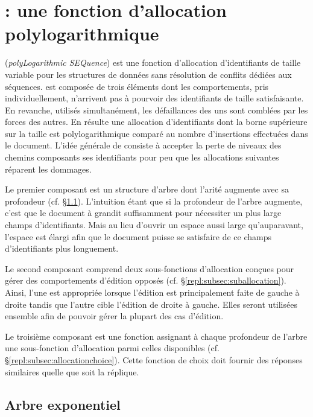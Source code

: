 
\section{\LSEQ : une fonction d'allocation polylogarithmique}
\label{repl:sec:proposal}

\LSEQ (\emph{polyLogarithmic SEQuence}) est une fonction d'allocation
d'identifiants de taille variable pour les structures de données sans résolution
de conflits dédiées aux séquences. \LSEQ est composée de trois éléments dont les
comportements, pris individuellement, n'arrivent pas à pourvoir des identifiants
de taille satisfaisante. En revanche, utilisés simultanément, les défaillances
des uns sont comblées par les forces des autres. En résulte une allocation
d'identifiants dont la borne supérieure sur la taille est polylogarithmique
comparé au nombre d'insertions effectuées dans le document. 
L'idée générale de \LSEQ consiste à accepter la perte de niveaux des chemins
composants ses identifiants pour peu que les allocations suivantes réparent les
dommages.

Le premier composant est un structure d'arbre dont l'arité augmente avec sa
profondeur (cf. §\ref{repl:subsec:exponentialtree}). L'intuition étant que si la
profondeur de l'arbre augmente, c'est que le document à grandit suffisamment
pour nécessiter un plus large champs d'identifiants. Mais au lieu d'ouvrir un
espace aussi large qu'auparavant, l'espace est élargi afin que le document
puisse se satisfaire de ce champs d'identifiants plus longuement.

Le second composant comprend deux sous-fonctions d'allocation conçues pour gérer
des comportements d'édition opposés (cf. §\ref{repl:subsec:suballocation}). Ainsi,
l'une est appropriée lorsque l'édition est principalement faite de gauche à
droite tandis que l'autre cible l'édition de droite à gauche. Elles seront
utilisées ensemble afin de pouvoir gérer la plupart des cas d'édition.

Le troisième composant est une fonction assignant à chaque profondeur de l'arbre
une sous-fonction d'allocation parmi celles disponibles
(cf. §\ref{repl:subsec:allocationchoice}). Cette fonction de choix doit fournir des
réponses similaires quelle que soit la réplique.

\subsection{Arbre exponentiel}
\label{repl:subsec:exponentialtree}

